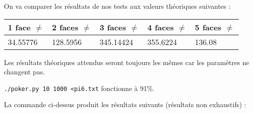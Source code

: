 \documentclass[12pt,a4paper]{article}
\begin{document}
On va comparer les résultats de nos tests aux valeurs théoriques suivantes :
\begin{center}
\begin{tabular}{|l|l|l|l|l|}
\hline
1 face $\neq$ & 2 faces $\neq$  & 3 faces $\neq$ & 4 faces $\neq$ & 5 faces $\neq$\\
\hline \hline
34.55776 & 128.5956 & 345.14424 & 355.6224 & 136.08\\ \hline
\end{tabular}
\end{center}

Les résultats théoriques attendus seront toujours les mêmes car les paramètres ne
changent pas.

\newpage
\texttt{./poker.py 10 1000 <pi6.txt} fonctionne à 91\%.

La commande ci-dessus produit les résultats suivants (résultats non exhaustifs) :
\end{document}
